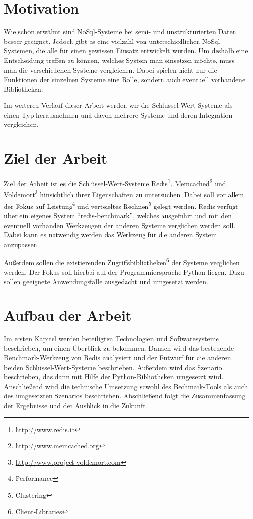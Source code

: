 \section{Motivation}
Wie schon erwähnt sind NoSql-Systeme bei semi- und unstrukturierten Daten besser
geeignet. Jedoch gibt es eine vielzahl von unterschiedlichen NoSql-Systemen,
die alle für einen gewissen Einsatz entwickelt wurden. Um deshalb eine
Entscheidung treffen zu können, welches System man einsetzen möchte, muss man
die verschiedenen Systeme vergleichen. Dabei spielen nicht nur die Funktionen
der einzelnen Systeme eine Rolle, sondern auch eventuell vorhandene
Bibliotheken.

Im weiteren Verlauf dieser Arbeit werden wir die Schlüssel-Wert-Systeme als einen
Typ herausnehmen und davon mehrere Systeme und deren Integration vergleichen.

\section{Ziel der Arbeit}
Ziel der Arbeit ist es die Schlüssel-Wert-Systeme
Redis\footnote{\url{http://www.redis.io}},
Memcached\footnote{\url{http://www.memcached.org}} und
Voldemort\footnote{\url{http://www.project-voldemort.com}} hinsichtlich ihrer
Eigenschaften zu untersuchen. Dabei soll vor allem der Fokus auf
Leistung\footnote{Performance} und verteieltes Rechnen\footnote{Clustering}
gelegt werden. Redis verfügt über ein eigenes System \enquote{redis-benchmark},
welches ausgeführt und mit den eventuell vorhanden Werkzeugen der anderen Systeme
verglichen werden soll. Dabei kann es notwendig werden das Werkzeug für die
anderen System anzupassen.

Außerdem sollen die existierenden
Zugriffsbibliotheken\footnote{Client-Libraries} der Systeme verglichen
werden. Der Fokus soll hierbei auf der Programmiersprache Python liegen. Dazu
sollen geeignete Anwendungsfälle ausgedacht und umgesetzt werden.

\section{Aufbau der Arbeit}
Im ersten Kapitel werden beteiligten Technologien und Softwaresysteme
beschrieben, um einen Überblick zu bekommen. Danach wird das bestehende
Benchmark-Werkzeug von Redis analysiert und der Entwurf für die anderen beiden
Schlüssel-Wert-Systeme beschrieben. Außerdem wird das Szenario beschrieben, das
dann mit Hilfe der Python-Bibliotheken umgesetzt wird. Anschließend wird die
technische Umsetzung sowohl des Bechmark-Tools als auch des umgesetzten
Szenarios beschrieben. Abschließend folgt die Zusammenfassung der Ergebnisse
und der Ausblick in die Zukunft.
